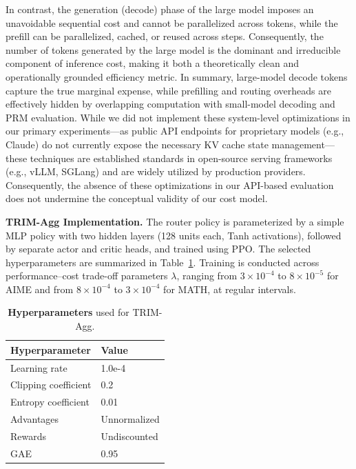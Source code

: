 \documentclass{article}
\theoremstyle{plain}
\theoremstyle{definition}
\theoremstyle{remark}
\begin{document}
In contrast, the generation (decode) phase of the large model imposes an unavoidable sequential cost and cannot be parallelized across tokens, while the prefill can be parallelized, cached, or reused across steps. Consequently, the number of tokens generated by the large model is the dominant and irreducible component of inference cost, making it both a theoretically clean and operationally grounded efficiency metric. 
In summary, large-model decode tokens capture the true marginal expense, while prefilling and routing overheads are effectively hidden by overlapping computation with small-model decoding and PRM evaluation. While we did not implement these system-level optimizations in our primary experiments—as public API endpoints for proprietary models (e.g., Claude) do not currently expose the necessary KV cache state management—these techniques are established standards in open-source serving frameworks (e.g., vLLM, SGLang) and are widely utilized by production providers. Consequently, the absence of these optimizations in our API-based evaluation does not undermine the conceptual validity of our cost model.

\textbf{TRIM-Agg Implementation.} The router policy is parameterized by a simple MLP policy with two hidden layers (128 units each, Tanh activations), followed by separate actor and critic heads, and trained using PPO. 
The selected hyperparameters are summarized in Table~\ref{tab:Agg_hyperparams}. 
Training is conducted across performance–cost trade-off parameters $\lambda$, ranging from $3\times10^{-4}$ to $8\times10^{-5}$ for AIME and from $8\times10^{-4}$ to $3\times10^{-4}$ for MATH, at regular intervals.

\begin{table}[t]
\caption{\footnotesize \textbf{Hyperparameters} used for TRIM-Agg.}
\label{tab:Agg_hyperparams}
\centering
\begin{tabular}{@{}ll@{}}
\toprule
\textbf{Hyperparameter} & \textbf{Value} \\
\midrule
Learning rate & 1.0e-4 \\
Clipping coefficient & 0.2 \\
Entropy coefficient & 0.01 \\
Advantages & Unnormalized \\
Rewards & Undiscounted \\
GAE & 0.95 \\
\bottomrule
\end{tabular}
\end{table}
\end{document}
